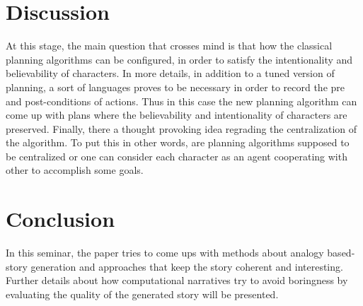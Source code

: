 \documentclass[english]{tktltiki}
\begin{document}
\section{Discussion}
At this stage, the main question that crosses mind is that how the classical planning algorithms can be configured, in order to satisfy the intentionality and believability of characters. In more details, in addition to a tuned version of planning, a sort of languages proves to be necessary in order to record the pre and post-conditions of actions. Thus in this case the new planning algorithm can come up with plans where the believability and intentionality of characters are preserved. Finally, there a thought provoking idea regrading the centralization of the algorithm. To put this in other words, are planning algorithms supposed to be centralized or one can consider each character as an agent cooperating with other to accomplish some goals.\cite{surprise} \cite{narrativeconflict}
\section{Conclusion}
In this seminar, the paper tries to come ups with methods about analogy based-story generation and approaches that keep the story coherent and interesting. Further details about how computational narratives try to avoid boringness by evaluating the quality of the generated story will be presented. 








\lastpage

\appendices

\pagestyle{empty}
\end{document}

